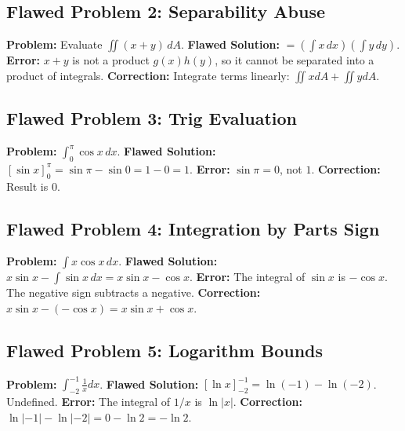 \documentclass[11pt,a4paper]{article}
\begin{document}
\subsection*{Flawed Problem 2: Separability Abuse}
\textbf{Problem:} Evaluate $\iint (x+y) \, dA$.
\textbf{Flawed Solution:}
$= (\int x \, dx)(\int y \, dy)$.
\textbf{Error:} $x+y$ is not a product $g(x)h(y)$, so it cannot be separated into a product of integrals.
\textbf{Correction:} Integrate terms linearly: $\iint x dA + \iint y dA$.

\subsection*{Flawed Problem 3: Trig Evaluation}
\textbf{Problem:} $\int_0^{\pi} \cos x \, dx$.
\textbf{Flawed Solution:} $[\sin x]_0^{\pi} = \sin \pi - \sin 0 = 1 - 0 = 1$.
\textbf{Error:} $\sin \pi = 0$, not $1$.
\textbf{Correction:} Result is $0$.

\subsection*{Flawed Problem 4: Integration by Parts Sign}
\textbf{Problem:} $\int x \cos x \, dx$.
\textbf{Flawed Solution:} $x \sin x - \int \sin x \, dx = x \sin x - \cos x$.
\textbf{Error:} The integral of $\sin x$ is $-\cos x$. The negative sign subtracts a negative.
\textbf{Correction:} $x \sin x - (-\cos x) = x \sin x + \cos x$.

\subsection*{Flawed Problem 5: Logarithm Bounds}
\textbf{Problem:} $\int_{-2}^{-1} \frac{1}{x} dx$.
\textbf{Flawed Solution:} $[\ln x]_{-2}^{-1} = \ln(-1) - \ln(-2)$. Undefined.
\textbf{Error:} The integral of $1/x$ is $\ln|x|$.
\textbf{Correction:} $\ln|-1| - \ln|-2| = 0 - \ln 2 = -\ln 2$.
\end{document}
